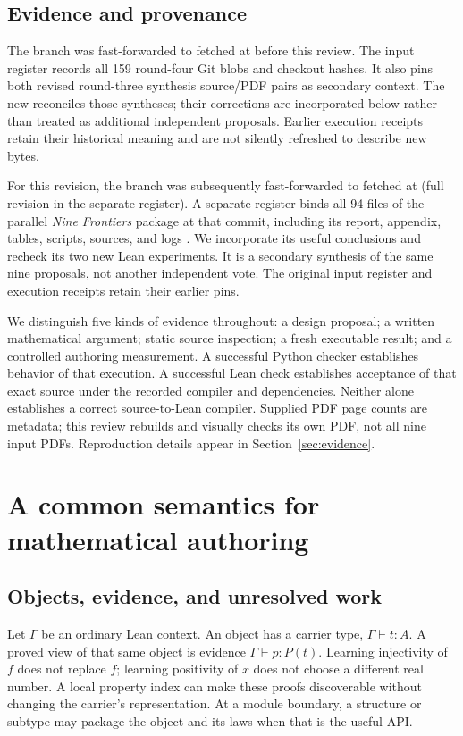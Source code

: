 \documentclass[11pt,letterpaper]{article}
\newcommand{\code}[1]{\texttt{\detokenize{#1}}}
\theoremstyle{definition}\newtheorem{definition}[proposition]{Definition}
\theoremstyle{remark}\newtheorem{remark}[proposition]{Remark}
\begin{document}
\subsection{Evidence and provenance}

The branch was fast-forwarded to fetched \code{main} at \code{58ced1c} before
this review. The input register records all 159 round-four Git blobs and
checkout hashes. It also pins both revised round-three synthesis source/PDF
pairs as secondary context. The new \code{main} reconciles those syntheses;
their corrections are incorporated below rather than treated as additional
independent proposals. Earlier execution receipts retain their historical
meaning and are not silently refreshed to describe new bytes.

For this revision, the branch was subsequently fast-forwarded to fetched
\code{main} at \code{c92ef05} (full revision in the separate register).
A separate register binds all 94 files of the parallel \emph{Nine Frontiers}
package at that commit, including its report, appendix, tables, scripts,
sources, and logs \cite{parallel-r4}. We incorporate its useful conclusions
and recheck its two new Lean experiments. It is a secondary synthesis of the
same nine proposals, not another independent vote. The original input register
and execution receipts retain their earlier pins.

We distinguish five kinds of evidence throughout: a design proposal; a written
mathematical argument; static source inspection; a fresh executable result;
and a controlled authoring measurement. A successful Python checker establishes
behavior of that execution. A successful Lean check establishes acceptance of
that exact source under the recorded compiler and dependencies. Neither alone
establishes a correct source-to-Lean compiler. Supplied PDF page counts are
metadata; this review rebuilds and visually checks its own PDF, not all nine
input PDFs. Reproduction details appear in Section~\ref{sec:evidence}.

\section{A common semantics for mathematical authoring}
\label{sec:semantics}

\subsection{Objects, evidence, and unresolved work}

Let $\Gamma$ be an ordinary Lean context. An object has a carrier type,
$\Gamma\vdash t:A$. A proved view of that same object is evidence
$\Gamma\vdash p:P(t)$. Learning injectivity of $f$ does not replace $f$;
learning positivity of $x$ does not choose a different real number. A local
property index can make these proofs discoverable without changing the
carrier's representation. At a module boundary, a structure or subtype may
package the object and its laws when that is the useful API.
\end{document}
